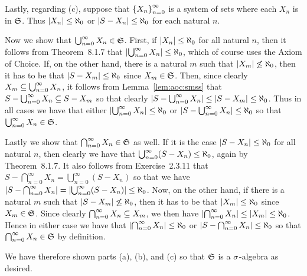 {{    Lastly, regarding (c), suppose that $\braces{X_n}_{n=0}^\infty$ is a system of sets where each $X_n$ is in $\fs$.
    Thus $\abs{X_n} \leq \al_0$ or $\abs{S - X_n} \leq \al_0$ for each natural $n$.

    Now we show that $\bigcup_{n=0}^\infty X_n \in \fs$.
    First, if $\abs{X_n} \leq \al_0$ for all natural $n$, then it follows from Theorem~8.1.7 that $\abs{\bigcup_{n=0}^\infty X_n} \leq \al_0$, which of course uses the Axiom of Choice.
    If, on the other hand, there is a natural $m$ such that $\abs{X_m} \not\leq \al_0$, then it has to be that $\abs{S - X_m} \leq \al_0$ since $X_m \in \fs$.
    Then, since clearly $X_m \ss \bigcup_{n=0}^\infty X_n$, it follows from Lemma~\ref{lem:aoc:smss} that $S - \bigcup_{n=0}^\infty X_n \ss S - X_m$ so that clearly $\abs{S - \bigcup_{n=0}^\infty X_n} \leq \abs{S - X_m} \leq \al_0$.
    Thus in all cases we have that either $\abs{\bigcup_{n=0}^\infty X_n} \leq \al_0$ or $\abs{S - \bigcup_{n=0}^\infty X_n} \leq \al_0$ so that $\bigcup_{n=0}^\infty X_n \in \fs$.

    Lastly we show that $\bigcap_{n=0}^\infty X_n \in \fs$ as well.
    If it is the case $\abs{S - X_n} \leq \al_0$ for all natural $n$, then clearly we have that $\bigcup_{n=0}^\infty (S - X_n) \leq \al_0$, again by Theorem~8.1.7.
    It also follows from Exercise~2.3.11 that $S - \bigcap_{n=0}^\infty X_n = \bigcup_{n=0}^\infty (S - X_n)$ so that we have $\abs{S - \bigcap_{n=0}^\infty X_n} = \abs{\bigcup_{n=0}^\infty (S - X_n)} \leq \al_0$.
    Now, on the other hand, if there is a natural $m$ such that $\abs{S - X_m} \not\leq \al_0$, then it has to be that $\abs{X_m} \leq \al_0$ since $X_m \in \fs$.
    Since clearly $\bigcap_{n=0}^\infty X_n \ss X_m$, we then have $\abs{\bigcap_{n=0}^\infty X_n} \leq \abs{X_m} \leq \al_0$.
    Hence in either case we have that $\abs{\bigcap_{n=0}^\infty X_n} \leq \al_0$ or $\abs{S - \bigcap_{n=0}^\infty X_n} \leq \al_0$ so that $\bigcap_{n=0}^\infty X_n \in \fs$ by definition.

    We have therefore shown parts (a), (b), and (c) so that $\fs$ is a $\s$-algebra as desired.
  }
}

